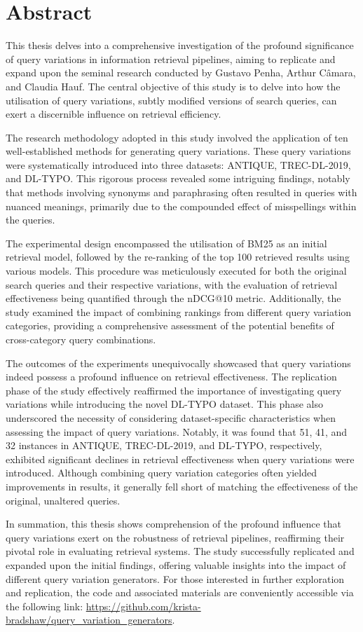 \chapter{Abstract}
This thesis delves into a comprehensive investigation of the profound significance of query variations in information retrieval pipelines, aiming to replicate and expand upon the seminal research conducted by Gustavo Penha, Arthur Câmara, and Claudia Hauf. The central objective of this study is to delve into how the utilisation of query variations, subtly modified versions of search queries, can exert a discernible influence on retrieval efficiency.

The research methodology adopted in this study involved the application of ten well-established methods for generating query variations. These query variations were systematically introduced into three datasets: ANTIQUE, TREC-DL-2019, and DL-TYPO. This rigorous process revealed some intriguing findings, notably that methods involving synonyms and paraphrasing often resulted in queries with nuanced meanings, primarily due to the compounded effect of misspellings within the queries.

The experimental design encompassed the utilisation of BM25 as an initial retrieval model, followed by the re-ranking of the top 100 retrieved results using various models. This procedure was meticulously executed for both the original search queries and their respective variations, with the evaluation of retrieval effectiveness being quantified through the nDCG@10 metric. Additionally, the study examined the impact of combining rankings from different query variation categories, providing a comprehensive assessment of the potential benefits of cross-category query combinations.

The outcomes of the experiments unequivocally showcased that query variations indeed possess a profound influence on retrieval effectiveness. The replication phase of the study effectively reaffirmed the importance of investigating query variations while introducing the novel DL-TYPO dataset. This phase also underscored the necessity of considering dataset-specific characteristics when assessing the impact of query variations. Notably, it was found that 51, 41, and 32 instances in ANTIQUE, TREC-DL-2019, and DL-TYPO, respectively, exhibited significant declines in retrieval effectiveness when query variations were introduced. Although combining query variation categories often yielded improvements in results, it generally fell short of matching the effectiveness of the original, unaltered queries.

In summation, this thesis shows comprehension of the profound influence that query variations exert on the robustness of retrieval pipelines, reaffirming their pivotal role in evaluating retrieval systems. The study successfully replicated and expanded upon the initial findings, offering valuable insights into the impact of different query variation generators. For those interested in further exploration and replication, the code and associated materials are conveniently accessible via the following link: \url{https://github.com/krista-bradshaw/query_variation_generators}.